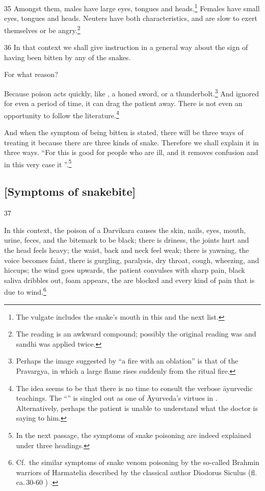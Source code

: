 \begin{translation}
\item[35]
Amongst them, males have large eyes, tongues and heads.\footnote{The 
vulgate includes the snake's mouth in this and the next list.}  Females have 
small 
eyes, tongues and heads. Neuters have both characteristics, and are slow to 
exert themselves or be angry.\footnote{The reading  
is an awkward compound; possibly the original reading was  and sandhi was applied twice.}

\item[36] In that context we shall give instruction in a general way
about the sign of having been bitten by any of the 
snakes.

For what reason? 

Because poison acts quickly, like , a honed
sword, or a thunderbolt.\footnote{Perhaps the image suggested by “a fire
    with an oblation” is that of the Pravargya, in which a large flame rises
    suddenly from the ritual fire.}  And ignored for even a period of time,
    it can drag the patient away. There is not even an opportunity to follow
    the literature.\footnote{The idea seems to be that there is no time to
        consult the verbose āyurvedic teachings.  The
        “” is
        singled out as one of Āyurveda's virtues in .
        Alternatively, perhaps the patient is unable to understand what the
        doctor is saying to him.} 

        And when the symptom of being bitten is stated, there will be three
        ways of treating it because there are three kinds of snake. Therefore
        we shall explain it in three ways. “For this is good for people who are ill,
        and it removes confusion and in this very case it ”.\footnote{In the next passage, the symptoms of snake 
        poisoning are indeed explained under three headings.}

\subsection{[Symptoms of snakebite]}

\item[37] 

In this context, the poison of a Darvīkara causes the skin, nails, eyes,
mouth, urine, feces, and the bitemark to be black; there is driness, the
joints hurt and the head feels heavy; the waist, back and neck feel weak;
there is yawning, the voice becomes faint, there is gurgling, paralysis,
dry throat, cough, wheezing, and hiccups; the wind goes upwards, the
patient convulses with sharp pain, black saliva dribbles out, foam
appears, the  are blocked and every kind of pain that
is due to wind.\footnote{Cf.\ the similar symptoms of snake venom
    poisoning by the so-called Brahmin warriors of Harmatelia described by
    the classical author Diodorus Siculus (fl.\,ca.\,30-60 \BCE)
    \citep[108]{egge-1975}.}


\end{translation}
